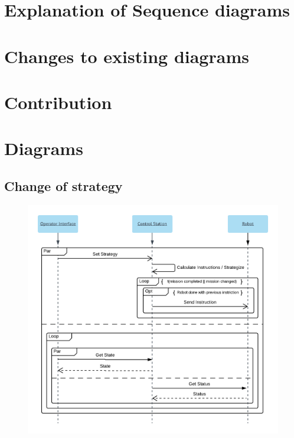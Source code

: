 \section{Explanation of Sequence diagrams}


\section{Changes to existing diagrams}


\section{Contribution}


\section{Diagrams}
\subsection{Change of strategy}
\begin{figure}[H]
\includegraphics[width=14cm]{docs/assignments/Assignment_5/diagram1.png}
\end{figure}


